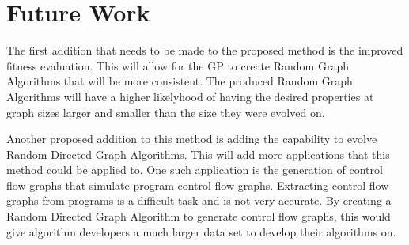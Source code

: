\documentclass{article}
\begin{document}
\section{Future Work}
The first addition that needs to be made to the proposed method is the improved fitness evaluation. This will allow for the GP to create Random Graph
Algorithms that will be more consistent. The produced Random Graph Algorithms will have a higher likelyhood of having the desired properties at
graph sizes larger and smaller than the size they were evolved on.

Another proposed addition to this method is adding the capability to evolve Random Directed Graph Algorithms. This will add more applications
that this method could be applied to. One such application is the generation of control flow graphs that simulate program control flow graphs. Extracting
control flow graphs from programs is a difficult task and is not very accurate. By creating a Random Directed Graph Algorithm to generate control flow graphs,
this would give algorithm developers a much larger data set to develop their algorithms on. 



 
\end{document}
